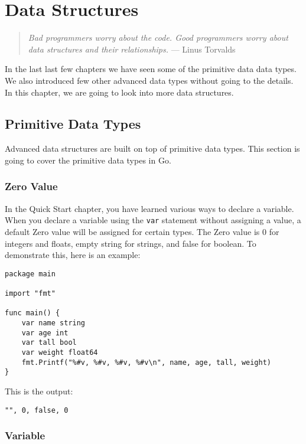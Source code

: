 \cleardoublepage
{}
\chapter{Data Structures}

\begin{quote}
\textit{Bad programmers worry about the code.  Good programmers
worry about data structures and their relationships.} --- Linus
Torvalds
\end{quote}

In the last last few chapters we have seen some of the primitive data
data types.  We also introduced few other advanced data types without
going to the details.  In this chapter, we are going to look into more
data structures.

\section{Primitive Data Types}

Advanced data structures are built on top of primitive data types. This section
is going to cover the primitive data types in Go.

\subsection{Zero Value}

In the Quick Start chapter, you have learned various ways to declare a variable.
When you declare a variable using the \texttt{var}
 statement without assigning a value, a default Zero value
 will be assigned for certain types. The Zero value is 0 for
integers and floats, empty string for strings, and false for boolean. To
demonstrate this, here is an example:

\begin{lstlisting}[caption=Zero values]
package main

import "fmt"

func main() {
    var name string
    var age int
    var tall bool
    var weight float64
    fmt.Printf("%#v, %#v, %#v, %#v\n", name, age, tall, weight)
}
\end{lstlisting}

This is the output:

\begin{lstlisting}[numbers=none]
"", 0, false, 0
\end{lstlisting}

\subsection{Variable}


